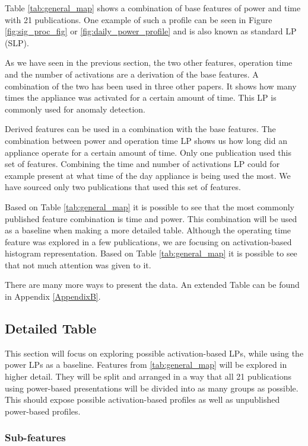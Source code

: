 Table \ref{tab:general_map} shows a combination of base features of power and time with 21 publications. 
One example of such a profile can be seen in Figure \ref{fig:sig_proc_fig} or \ref{fig:daily_power_profile} and is also known as standard LP (SLP).

As we have seen in the previous section, the two other features, operation time and the number of activations are a derivation of the base features.
A combination of the two has been used in three other papers.
It shows how many times the appliance was activated for a certain amount of time. 
This LP is commonly used for anomaly detection.

Derived features can be used in a combination with the base features.
The combination between power and operation time LP shows us how long did an appliance operate for a certain amount of time.
Only one publication used this set of features.
Combining the time and number of activations LP could for example present at what time of the day appliance is being used the most.
We have sourced only two publications that used this set of features.

Based on Table \ref{tab:general_map} it is possible to see that the most commonly
published feature combination is time and power. This combination will be used 
as a baseline when making a more detailed table. Although the operating time feature was 
explored in a few publications, we are focusing on activation-based histogram representation.
Based on Table \ref{tab:general_map} it is possible to see that not much attention was given to it. 

There are many more ways to present the data. An extended Table can be found in Appendix \ref{AppendixB}.

\subsection{Detailed Table}

This section will focus on exploring possible activation-based LPs,
while using the power LPs as a baseline. 
Features from \ref{tab:general_map} will be explored in higher detail. 
They will be split and arranged in a way that all 21 publications using power-based presentations will be divided into as many groups as possible. 
This should expose possible activation-based profiles as well as unpublished power-based profiles.

\subsubsection{Sub-features} \label{sec:subfeatures}

